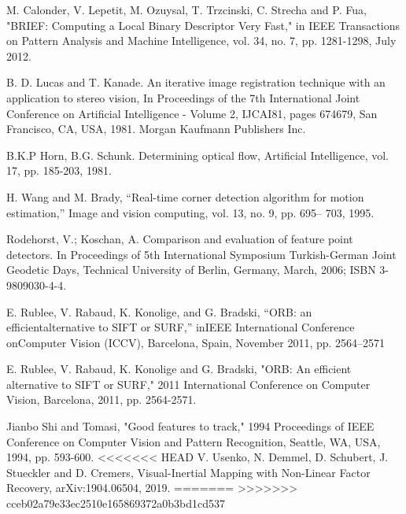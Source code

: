 \documentclass{easychair}
\begin{document}
\begin{thebibliography}{00}
	
	M. Calonder, V. Lepetit, M. Ozuysal, T. Trzcinski, C. Strecha and P. Fua, "BRIEF: Computing a Local Binary Descriptor Very Fast," in IEEE Transactions on Pattern Analysis and Machine Intelligence, vol. 34, no. 7, pp. 1281-1298, July 2012.
	
	 B. D. Lucas and T. Kanade. An iterative image registration technique
	with an application to stereo vision, In Proceedings of the 7th International
	Joint Conference on Artificial Intelligence - Volume 2, IJCAI81,
	pages 674679, San Francisco, CA, USA, 1981. Morgan Kaufmann
	Publishers Inc.
	
	 B.K.P Horn, B.G. Schunk. Determining optical flow, Artificial Intelligence,
	vol. 17, pp. 185-203, 1981.
	
	
	 H. Wang and M. Brady, “Real-time corner detection algorithm for
	motion estimation,” Image and vision computing, vol. 13, no. 9, pp. 695–
	703, 1995.
	
	 Rodehorst, V.; Koschan, A. Comparison and evaluation of feature point detectors. In Proceedings
	of 5th International Symposium Turkish-German Joint Geodetic Days, Technical University of
	Berlin, Germany, March, 2006; ISBN 3-9809030-4-4.
	
	 E. Rublee, V. Rabaud, K. Konolige, and G. Bradski, “ORB: an efficientalternative  to  SIFT  or  SURF,”  inIEEE  International  Conference  onComputer Vision (ICCV), Barcelona, Spain, November 2011, pp. 2564–2571
	
	 E. Rublee, V. Rabaud, K. Konolige and G. Bradski, "ORB: An efficient alternative to SIFT or SURF," 2011 International Conference on Computer Vision, Barcelona, 2011, pp. 2564-2571.
	
	 Jianbo Shi and Tomasi, "Good features to track," 1994 Proceedings of IEEE Conference on Computer Vision and Pattern Recognition, Seattle, WA, USA, 1994, pp. 593-600.
<<<<<<< HEAD
	 V. Usenko, N. Demmel, D. Schubert, J. Stueckler and D. Cremers, Visual-Inertial Mapping with Non-Linear Factor Recovery, arXiv:1904.06504, 2019.
=======
>>>>>>> cceb02a79e33ec2510e165869372a0b3bd1cd537
	
	
	
\end{thebibliography}



%
%
%
%
%
\end{document}
